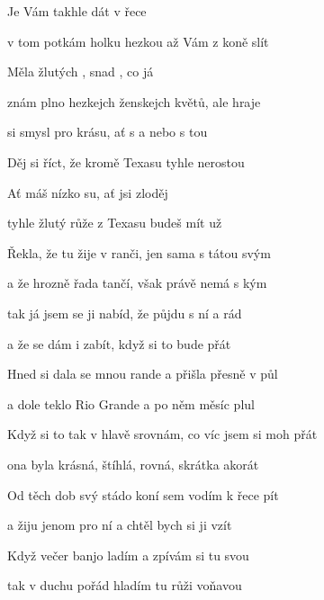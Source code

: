 

\zs
Je Vám takhle  dát  v řece 

v tom potkám holku hezkou až  Vám z koně slít

Měla  žlutých , snad , co já 

znám plno hezkejch ženskejch květů, ale  hraje 
\ks

\zr
{} si  smysl pro krásu, ať s  a nebo s tou

Děj si říct, že kromě Texasu tyhle  nerostou

Ať máš  nízko su, ať jsi  zloděj 

tyhle žlutý růže z Texasu budeš  mít už 
\kr

\zs
Řekla, že tu žije v ranči, jen sama s tátou svým

a že hrozně řada tančí, však právě nemá s kým

tak já jsem se ji nabíd, že půjdu s ní a rád

a že se dám i zabít, když si to bude přát
\ks

\zs
Hned si dala se mnou rande a přišla přesně v půl

a dole teklo Rio Grande a po něm měsíc plul

Když si to tak v hlavě srovnám, co víc jsem si moh přát

ona byla krásná, štíhlá, rovná, skrátka akorát
\ks

\zr  \kr

\zs
Od těch dob svý stádo koní sem vodím k řece pít

a žiju jenom pro ní a chtěl bych si ji vzít

Když večer banjo ladím a zpívám si tu svou

tak v duchu pořád hladím tu růži voňavou
\ks

\zr  \kr

\kp






